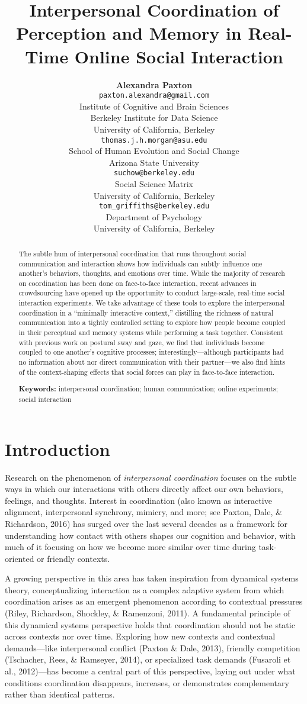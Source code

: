 \documentclass[10pt, letterpaper]{article}
\title{Interpersonal Coordination of Perception and Memory in Real-Time Online
Social Interaction}
\author{{\large \bf Alexandra Paxton} \\ \texttt{paxton.alexandra@gmail.com} \\ Institute of Cognitive and Brain Sciences \\ Berkeley Institute for Data Science \\ University of California, Berkeley \And {\large \bf Thomas J. H. Morgan} \\ \texttt{thomas.j.h.morgan@asu.edu} \\ School of Human Evolution and Social Change \\ Arizona State University \AND {\large \bf Jordan W. Suchow} \\ \texttt{suchow@berkeley.edu} \\ Social Science Matrix \\ University of California, Berkeley \And {\large \bf Thomas L. Griffiths} \\ \texttt{tom\_griffiths@berkeley.edu} \\ Department of Psychology \\ University of California, Berkeley}
\begin{document}
\maketitle

\begin{abstract}
The subtle hum of interpersonal coordination that runs throughout social
communication and interaction shows how individuals can subtly influence
one another's behaviors, thoughts, and emotions over time. While the
majority of research on coordination has been done on face-to-face
interaction, recent advances in crowdsourcing have opened up the
opportunity to conduct large-scale, real-time social interaction
experiments. We take advantage of these tools to explore the
interpersonal coordination in a ``minimally interactive context,''
distilling the richness of natural communication into a tightly
controlled setting to explore how people become coupled in their
perceptual and memory systems while performing a task together.
Consistent with previous work on postural sway and gaze, we find that
individuals become coupled to one another's cognitive processes;
interestingly---although participants had no information about nor
direct communication with their partner---we also find hints of the
context-shaping effects that social forces can play in face-to-face
interaction.

\textbf{Keywords:}
interpersonal coordination; human communication; online experiments;
social interaction
\end{abstract}

\section{Introduction}\label{introduction}

Research on the phenomenon of \emph{interpersonal coordination} focuses
on the subtle ways in which our interactions with others directly affect
our own behaviors, feelings, and thoughts. Interest in coordination
(also known as interactive alignment, interpersonal synchrony, mimicry,
and more; see Paxton, Dale, \& Richardson, 2016) has surged over the
last several decades as a framework for understanding how contact with
others shapes our cognition and behavior, with much of it focusing on
how we become more similar over time during task-oriented or friendly
contexts.

A growing perspective in this area has taken inspiration from dynamical
systems theory, conceptualizing interaction as a complex adaptive system
from which coordination arises as an emergent phenomenon according to
contextual pressures (Riley, Richardson, Shockley, \& Ramenzoni, 2011).
A fundamental principle of this dynamical systems perspective holds that
coordination should not be static across contexts nor over time.
Exploring how new contexts and contextual demands---like interpersonal
conflict (Paxton \& Dale, 2013), friendly competition (Tschacher, Rees,
\& Ramseyer, 2014), or specialized task demands (Fusaroli et al.,
2012)---has become a central part of this perspective, laying out under
what conditions coordination disappears, increases, or demonstrates
complementary rather than identical patterns.
\end{document}
